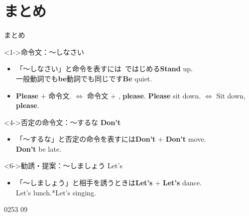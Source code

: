 \documentclass[aspectratio=169,xcolor={dvipsnames,table}]{beamer}
\begin{document}
\section{まとめ}
\begin{frame}[plain]{まとめ}

  \begin{block}<1->{命令文：～しなさい}

    \begin{itemize}[square]\small
      \item<2-> 「～しなさい」と命令を表すには\,\,\,ではじめる\hfill{\scriptsize \textbf{Stand} up.}\\
            {\scriptsize 一般動詞でも\textbf{be}動詞でも同じです}\hfill{\scriptsize \textbf{Be} quiet.}\\
      \item<3-> \textbf{Please} $+$ 命令文. $\Longleftrightarrow$ 命令文 $+$ , \textbf{please}.%
            \hfill{\scriptsize \textbf{Please} sit down. $\Longleftrightarrow$ Sit down, \textbf{please}.}\\
    \end{itemize}
  \end{block}


  \begin{block}<4->{否定の命令文：～するな \textbf{Don't} }
    \begin{itemize}[square]\small
      \item<5-> 「～するな」と否定の命令を表すには\textbf{Don't} $+$ \hfill{\scriptsize \textbf{Don't} move.}\\
            \hfill{\scriptsize \textbf{Don't} be late.}
    \end{itemize}
  \end{block}

  \begin{block}<6->{勧誘・提案：～しましょう Let's }
    \begin{itemize}[square]\small
      \item<7-> 「～しましょう」と相手を誘うときは\textbf{Let's} $+$ \hfill{\scriptsize \textbf{Let's} dance.}\\
            \hfill{\scriptsize *Let's lunch.\hspace{20pt}*Let's singing.}
    \end{itemize}
  \end{block}
  \vspace{-10pt}
  \hfill{\tiny 0253}\,{\scriptsize {}}\,{\tiny 09}
\end{frame}
\end{document}
